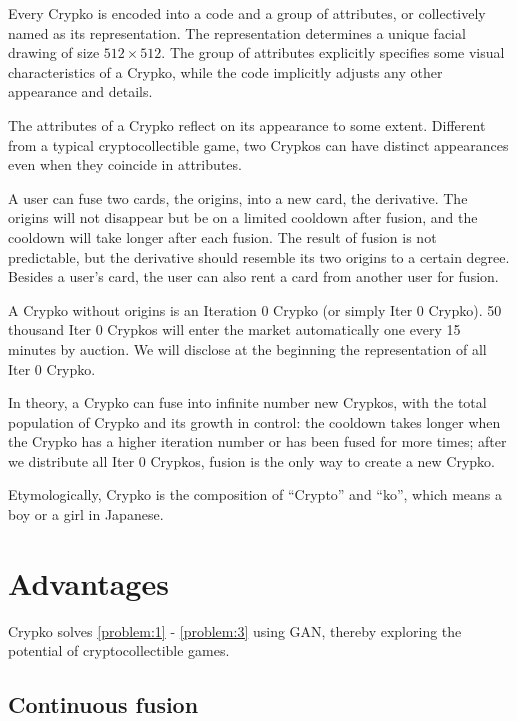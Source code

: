 \documentclass[b5paper]{article}
\begin{document}
Every Crypko is encoded into a code and a group of attributes, or collectively named as its representation. The representation determines a unique facial drawing of size $512 \times 512$. The group of attributes explicitly specifies some visual characteristics of a Crypko, while the code implicitly adjusts any other appearance and details.

The attributes of a Crypko reflect on its appearance to some extent. Different from a typical cryptocollectible game, two Crypkos can have distinct appearances even when they coincide in attributes.

A user can fuse two cards, the origins, into a new card, the derivative. The origins will not disappear but be on a limited cooldown after fusion, and the cooldown will take longer after each fusion. The result of fusion is not predictable, but the derivative should resemble its two origins to a certain degree. Besides a user's card, the user can also rent a card from another user for fusion.

A Crypko without origins is an Iteration 0 Crypko (or simply Iter 0 Crypko). 50 thousand Iter 0 Crypkos will enter the market automatically one every 15 minutes by auction. We will disclose at the beginning the representation of all Iter 0 Crypko.

In theory, a Crypko can fuse into infinite number new Crypkos, with the total population of Crypko and its growth in control: the cooldown takes longer when the Crypko has a higher iteration number or has been fused for more times; after we distribute all Iter 0 Crypkos, fusion is the only way to create a new Crypko.

Etymologically, Crypko is the composition of ``Crypto'' and ``ko'', which means a boy or a girl in Japanese.

\section{Advantages}

Crypko solves \ref{problem:1} - \ref{problem:3} using GAN, thereby exploring the potential of cryptocollectible games.

\subsection{Continuous fusion}
\end{document}
